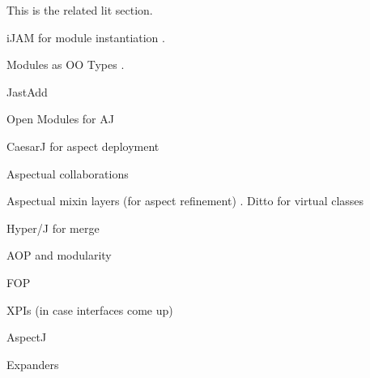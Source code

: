 This is the related lit section.

iJAM for module instantiation \cite{iJAM}.

Modules as OO Types \cite{modulesastypes}.

JastAdd \cite{jastadd, jastaddjavacompiler}

Open Modules for AJ \cite{openmodulesaj}

CaesarJ for aspect deployment \cite{caesarj}

Aspectual collaborations \cite{lieberherr03aspectual}

Aspectual mixin layers (for aspect refinement) \cite{aspectualmixinlayers}.
Ditto for virtual classes \cite{virtualclasses89}

Hyper/J for merge \cite{hyperj}

AOP and modularity \cite{aopmodularreasoning}

FOP \cite{fopstepwiserefinement}

XPIs (in case interfaces come up) \cite{xpi}

AspectJ \cite{overviewaspectj}

Expanders \cite{expanders}